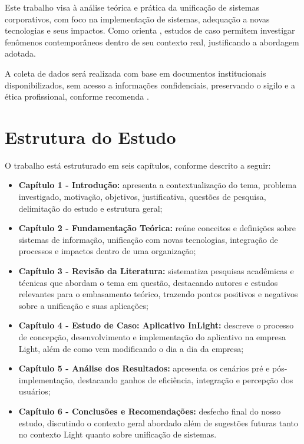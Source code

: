 Este trabalho visa à análise teórica e prática da unificação de sistemas corporativos, com foco na implementação de sistemas, adequação a novas tecnologias e seus impactos. Como orienta \cite{yin2015}, estudos de caso permitem investigar fenômenos contemporâneos dentro de seu contexto real, justificando a abordagem adotada.

A coleta de dados será realizada com base em documentos institucionais disponibilizados, sem acesso a informações confidenciais, preservando o sigilo e a ética profissional, conforme recomenda \cite{gil2019}.

\section{Estrutura do Estudo}

O trabalho está estruturado em seis capítulos, conforme descrito a seguir:

\begin{itemize}
    \item \textbf{Capítulo 1 - Introdução:} apresenta a contextualização do tema, problema investigado, motivação, objetivos, justificativa, questões de pesquisa, delimitação do estudo e estrutura geral;
    \item \textbf{Capítulo 2 - Fundamentação Teórica:} reúne conceitos e definições sobre sistemas de informação, unificação com novas tecnologias, integração de processos e impactos dentro de uma organização;
    \item \textbf{Capítulo 3 - Revisão da Literatura:} sistematiza pesquisas acadêmicas e técnicas que abordam o tema em questão, destacando autores e estudos relevantes para o embasamento teórico, trazendo pontos positivos e negativos sobre a unificação e suas aplicações;
    \item \textbf{Capítulo 4 - Estudo de Caso: Aplicativo InLight:} descreve o processo de concepção, desenvolvimento e implementação do aplicativo na empresa Light, além de como vem modificando o dia a dia da empresa;
    \item \textbf{Capítulo 5 - Análise dos Resultados:} apresenta os cenários pré e pós-implementação, destacando ganhos de eficiência, integração e percepção dos usuários;
    \item \textbf{Capítulo 6 - Conclusões e Recomendações:} desfecho final do nosso estudo, discutindo o contexto geral abordado além de sugestões futuras tanto no contexto Light quanto sobre unificação de sistemas.
\end{itemize}
